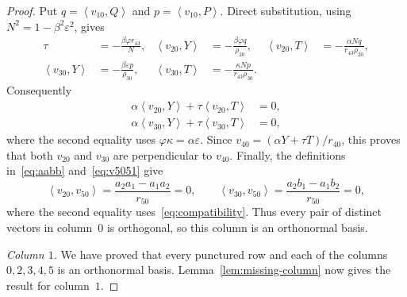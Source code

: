 \documentclass[10pt,a4paper]{amsart}
\newcommand{\ip}[2]{\left\langle #1,#2\right\rangle}
\begin{document}
\begin{proof}
Put $q=\ip{v_{10}}{Q}$ and $p=\ip{v_{10}}{P}$.  Direct substitution, using
$N^2=1-\beta^2\varepsilon^2$, gives
\begin{align*}
\tau&=-\frac{\beta\varphi r_{43}}{N},&
\ip{v_{20}}{Y}&=-\frac{\beta\varphi q}{\rho_{20}},&
\ip{v_{20}}{T}&=-\frac{\alpha Nq}{r_{43}\rho_{20}},\\
\ip{v_{30}}{Y}&=-\frac{\beta\varepsilon p}{\rho_{30}},&
\ip{v_{30}}{T}&=-\frac{\kappa Np}{r_{43}\rho_{30}}.
\end{align*}
Consequently
\begin{align*}
\alpha\ip{v_{20}}{Y}+\tau\ip{v_{20}}{T}&=0,\\
\alpha\ip{v_{30}}{Y}+\tau\ip{v_{30}}{T}&=0,
\end{align*}
where the second equality uses $\varphi\kappa=\alpha\varepsilon$.  Since
$v_{40}=(\alpha Y+\tau T)/r_{40}$, this proves that both $v_{20}$ and
$v_{30}$ are perpendicular to $v_{40}$.  Finally, the definitions
in~\eqref{eq:aabb} and~\eqref{eq:v5051} give
\[
\ip{v_{20}}{v_{50}}=\frac{a_2a_1-a_1a_2}{r_{50}}=0,
\qquad
\ip{v_{30}}{v_{50}}=\frac{a_2b_1-a_1b_2}{r_{50}}=0,
\]
where the second equality uses~\eqref{eq:compatibility}.  Thus every pair of
distinct vectors in column~$0$ is orthogonal, so this column is an
orthonormal basis.

\emph{Column $1$.}
We have proved that every punctured row and each of the columns
$0,2,3,4,5$ is an orthonormal basis.  Lemma~\ref{lem:missing-column} now gives
the result for column~$1$.
\end{proof}
\end{document}
